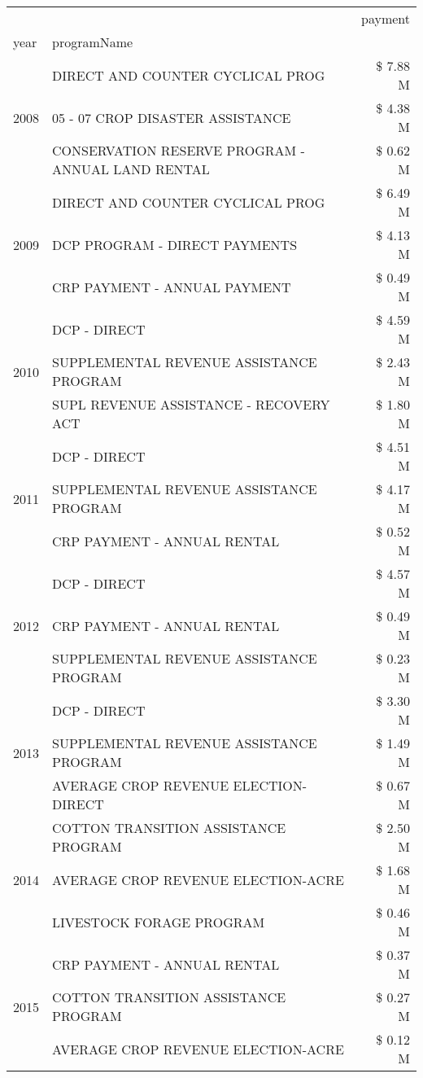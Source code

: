\begin{tabular}{llr}
\toprule
 &  & payment \\
year & programName &  \\
\midrule
\multirow[t]{3}{*}{2008} & DIRECT AND COUNTER CYCLICAL PROG & \$ 7.88 M \\
 & 05 - 07 CROP DISASTER ASSISTANCE & \$ 4.38 M \\
 & CONSERVATION RESERVE PROGRAM - ANNUAL LAND RENTAL & \$ 0.62 M \\
\cline{1-3}
\multirow[t]{3}{*}{2009} & DIRECT AND COUNTER CYCLICAL PROG & \$ 6.49 M \\
 & DCP PROGRAM - DIRECT PAYMENTS & \$ 4.13 M \\
 & CRP PAYMENT - ANNUAL PAYMENT & \$ 0.49 M \\
\cline{1-3}
\multirow[t]{3}{*}{2010} & DCP - DIRECT & \$ 4.59 M \\
 & SUPPLEMENTAL REVENUE ASSISTANCE PROGRAM & \$ 2.43 M \\
 & SUPL REVENUE ASSISTANCE - RECOVERY ACT & \$ 1.80 M \\
\cline{1-3}
\multirow[t]{3}{*}{2011} & DCP - DIRECT & \$ 4.51 M \\
 & SUPPLEMENTAL REVENUE ASSISTANCE PROGRAM & \$ 4.17 M \\
 & CRP PAYMENT - ANNUAL RENTAL & \$ 0.52 M \\
\cline{1-3}
\multirow[t]{3}{*}{2012} & DCP - DIRECT & \$ 4.57 M \\
 & CRP PAYMENT - ANNUAL RENTAL & \$ 0.49 M \\
 & SUPPLEMENTAL REVENUE ASSISTANCE PROGRAM & \$ 0.23 M \\
\cline{1-3}
\multirow[t]{3}{*}{2013} & DCP - DIRECT & \$ 3.30 M \\
 & SUPPLEMENTAL REVENUE ASSISTANCE PROGRAM & \$ 1.49 M \\
 & AVERAGE CROP REVENUE ELECTION-DIRECT & \$ 0.67 M \\
\cline{1-3}
\multirow[t]{3}{*}{2014} & COTTON TRANSITION ASSISTANCE PROGRAM & \$ 2.50 M \\
 & AVERAGE CROP REVENUE ELECTION-ACRE & \$ 1.68 M \\
 & LIVESTOCK FORAGE PROGRAM & \$ 0.46 M \\
\cline{1-3}
\multirow[t]{3}{*}{2015} & CRP PAYMENT - ANNUAL RENTAL & \$ 0.37 M \\
 & COTTON TRANSITION ASSISTANCE PROGRAM & \$ 0.27 M \\
 & AVERAGE CROP REVENUE ELECTION-ACRE & \$ 0.12 M \\

\end{tabular}
